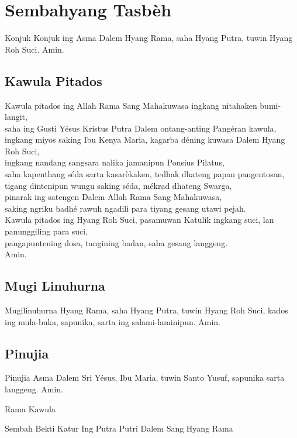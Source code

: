 \documentclass{scrbook}
\title{}
\author{}
\date{2015-10-16T23:26:23.331739660}
\begin{document}
\chapter*{Sembahyang Tasb\`eh}

 Konjuk Konjuk ing Asma Dalem Hyang Rama, saha Hyang Putra, tuwin Hyang
Roh Suci. Amin.  

\section*{Kawula Pitados} 

Kawula pitados ing Allah Rama Sang
Mahakuwasa ingkang nitahaken bumi-langit, \\
saha ing Gusti Y\'esus
Kristus Putra Dalem ontang-anting Pang\'eran kawula,\\ ingkang miyos
saking Ibu Kenya Maria, kagarba d\'ening kuwasa Dalem Hyang Roh Suci,\\
ingkang nandang sangsara nalika jamanipun Ponsius Pilatus, \\
saha kapenthang s\'eda sarta kasar\`ekaken, tedhak dhateng papan
pangentosan,\\ 
tigang dintenipun wungu saking s\'eda, m\'ekrad dhateng
Swarga, \\
pinarak ing satengen Dalem Allah Rama Sang Mahakuwasa,\\ saking ngriku badh\'e rawuh ngadili para tiyang gesang utawi pejah. \\
Kawula
pitados ing Hyang Roh Suci, pasamuwan Katulik ingkang suci, lan panunggiling para suci,\\ 
pangapuntening
dosa, tangining badan, saha gesang langgeng. \\
Amin.  

\section*{Mugi Linuhurna} 
Mugilinuhurna Hyang Rama, saha Hyang Putra, tuwin Hyang Roh Suci, kados ing
mula-buka, sapunika, sarta ing salami-laminipun. Amin.  

\section*{Pinujia} 
Pinujia Asma Dalem Sri Y\'esus, Ibu Maria, tuwin Santo Yusuf, sapunika sarta
langgeng. Amin.  

Rama Kawula  

Sembah Bekti Katur Ing Putra Putri Dalem
Sang Hyang Rama 
\end{document}
